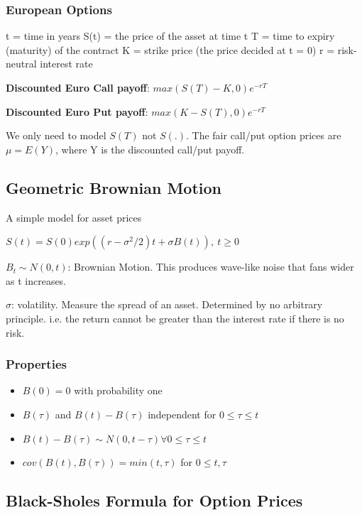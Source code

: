 \documentclass[11pt]{article}
\begin{document}
\subsubsection{European Options}
\label{sec:org520dd60}

t = time in years
S(t) = the price of the asset at time t
T = time to expiry (maturity) of the contract
K = strike price (the price decided at t = 0)
r = risk-neutral interest rate

\textbf{Discounted Euro Call payoff}: \(max(S(T) - K, 0)e^{-rT}\)

\textbf{Discounted Euro Put payoff}: \(max(K - S(T), 0)e^{-rT}\)

We only need to model \(S(T)\) not \(S(.)\). The fair call/put option prices are
\(\mu = E(Y)\), where Y is the discounted call/put payoff.

\subsection{Geometric Brownian Motion}
\label{sec:orgbe78828}

A simple model for asset prices

\(S(t) = S(0) exp((r - \sigma^2/2)t + \sigma B(t)), \ t \geq 0\)

\(B_t \sim N(0, t)\): Brownian Motion. This produces wave-like noise that fans
wider as t increases.

\(\sigma\): volatility. Measure the spread of an asset. Determined by no arbitrary
principle. i.e. the return cannot be greater than the interest rate if there is
no risk.

\subsubsection{Properties}
\label{sec:org887f2a1}

\begin{itemize}
\item \(B(0) = 0\) with probability one
\item \(B(\tau)\) and \(B(t) - B(\tau)\) independent for \(0 \leq \tau \leq t\)
\item \(B(t) - B(\tau) \sim N(0, t - \tau) \forall 0 \leq \tau \leq t\)
\item \(cov(B(t), B(\tau)) = min(t, \tau)\) for \(0 \leq t, \tau\)
\end{itemize}

\subsection{Black-Sholes Formula for Option Prices}
\label{sec:org15a213b}
\end{document}
